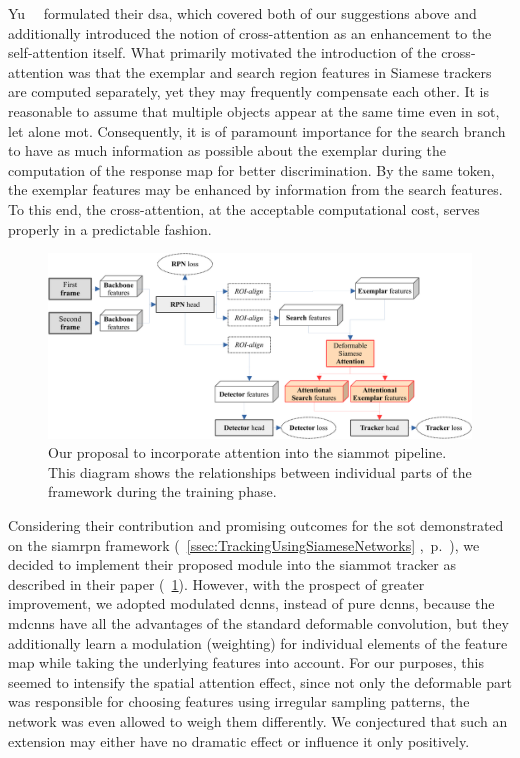 Yu~\etal{}~\cite{yu2021dsa} formulated their \gls{dsa}, which covered both of our suggestions above and additionally introduced the notion of cross-attention as an enhancement to the self-attention itself. What primarily motivated the introduction of the cross-attention was that the exemplar and search region features in Siamese trackers are computed separately, yet they may frequently compensate each other. It is reasonable to assume that multiple objects appear at the same time even in \gls{sot}, let alone \gls{mot}. Consequently, it is of paramount importance for the search branch to have as much information as possible about the exemplar during the computation of the response map for better discrimination. By the same token, the exemplar features may be enhanced by information from the search features. To this end, the cross-attention, at the acceptable computational cost, serves properly in a predictable fashion.

\begin{figure}[t]
    \centerline{\includegraphics[width=\linewidth]{figures/siamese_tracking/siammot_attention_training.pdf}}
    \caption[\gls{siammot} with attention]{Our proposal to incorporate attention into the \gls{siammot} pipeline. This diagram shows the relationships between individual parts of the framework during the training phase.}
    \label{fig:SiamMOTWithAttention}
\end{figure}

Considering their contribution and promising outcomes for the \gls{sot} demonstrated on the \gls{siamrpn} framework (\sectiontext{}~\ref{ssec:TrackingUsingSiameseNetworks} ,~p.~\pageref{ssec:TrackingUsingSiameseNetworks}), we decided to implement their proposed module into the \gls{siammot} tracker as described in their paper (\figtext{}~\ref{fig:SiamMOTWithAttention}). However, with the prospect of greater improvement, we adopted modulated \glspl{dcnn}, instead of pure \glspl{dcnn}, because the \glspl{mdcnn} have all the advantages of the standard deformable convolution, but they additionally learn a modulation (weighting) for individual elements of the feature map while taking the underlying features into account. For our purposes, this seemed to intensify the spatial attention effect, since not only the deformable part was responsible for choosing features using irregular sampling patterns, the network was even allowed to weigh them differently. We conjectured that such an extension may either have no dramatic effect or influence it only positively.

